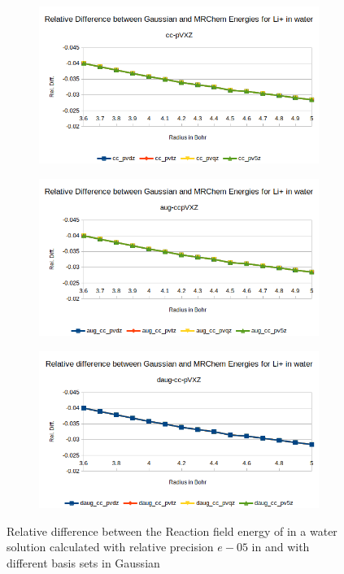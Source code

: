 \documentclass[../master_thesis.tex]{subfiles}
\begin{document}
\begin{figure}[h!]
  \centering
  \begin{subfigure}[b]{0.75\linewidth}
    \includegraphics[width=\linewidth]{img/lipreldiff.png}
  \end{subfigure}
  \begin{subfigure}[b]{0.75\linewidth}
    \includegraphics[width=\linewidth]{img/lipaugreldiff.png}
  \end{subfigure}
  \begin{subfigure}[b]{0.75\linewidth}
    \includegraphics[width=\linewidth]{img/lipdaugreldiff.png}
  \end{subfigure}
  \caption{Relative difference between the Reaction field energy of in a water solution calculated with relative precision $e-05$ in \mrchem
  and with different basis sets in Gaussian}
  \label{fig:lipreldiff}
\end{figure}
\end{document}
